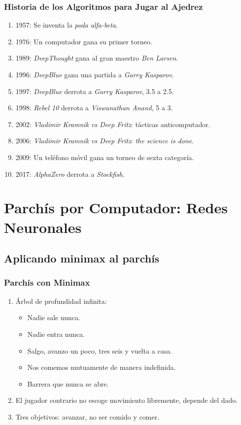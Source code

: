 \documentclass[a4paper,t,xcolor=pst,dvips,colortheme]{beamer}
\begin{document}
\begin{frame}[c]
    \frametitle{Historia de los Algoritmos para Jugar al Ajedrez}
    \begin{enumerate}[<+->]
        \item 1957: Se inventa la \emph{poda alfa-beta}.
        \item 1976: Un computador gana su primer torneo.
        \item 1989: \emph{DeepThought} gana al gran maestro \emph{Ben Larsen}.
        \item 1996: \emph{DeepBlue} gana una partida a \emph{Garry Kasparov}.
        \item 1997: \emph{DeepBlue} derrota a \emph{Garry Kasparov}, 3.5 a 2.5.
        \item 1998: \emph{Rebel 10} derrota a \emph{Viswanathan Anand}, 5 a 3.
        \item 2002: \emph{Vladimir Kramnik vs Deep Fritz}: tácticas anticomputador.
        \item 2006: \emph{Vladimir Kramnik vs Deep Fritz}: \emph{the science is done}.
        \item 2009: Un teléfono móvil gana un torneo de sexta categoría.
        \item 2017: \emph{AlphaZero} derrota a \emph{Stockfish}.
    \end{enumerate}
\end{frame}

\section{Parchís por Computador: Redes Neuronales}

\subsection{Aplicando minimax al parchís}

\begin{frame}[c]
    \frametitle{Parchís con Minimax}
    \begin{enumerate}[<+->]
        \item Árbol de profundidad infinita:
        \begin{itemize}
            \item Nadie sale nunca. 
            \item Nadie entra nunca.
            \item Salgo, avanzo un poco, tres seis y vuelta a casa.
            \item Nos comemos mutuamente de manera indefinida.
            \item Barrera que nunca se abre.
        \end{itemize}
        \item El jugador contrario no escoge movimiento libremente, depende del dado.
        \item Tres objetivos: avanzar, no ser comido y comer.
    \end{enumerate}
\end{frame}
\end{document}
